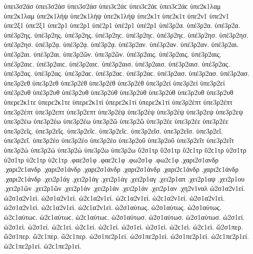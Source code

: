 {ὑπει3σ2άσ ὑπει3σ2άσ ὑπει3σ2άσ ὑπει3ϲ2άϲ ὑπει3ϲ2άϲ ὑπει3ϲ2άϲ 
ὑπε2κ1λαμ ὑπε2κ1λαμ   %
ὑπε2κ1λήψ ὑπε2κ1λήψ ὑπε2κ1λήψ   %
ὑπε2κ1τ ὑπε2κ1τ   %
ὑπε2ν1 ὑπε2ν1 
ὑπε2ξ1 ὑπε2ξ1 
ὑπε2ρ1 ὑπε2ρ1 
ὑπέ2ρ1 ὑπέ2ρ1 ὑπέ2ρ1 
ὑπέ3ρ2α. ὑπέ3ρ2α. ὑπέ3ρ2α.   %
ὑπέ3ρ2ης. ὑπέ3ρ2ης. ὑπέ3ρ2ης. ὑπέ3ρ2ηϲ. ὑπέ3ρ2ηϲ. ὑπέ3ρ2ηϲ. 
ὑπέ3ρ2ησ. ὑπέ3ρ2ησ. ὑπέ3ρ2ησ. 
ὑπέ3ρ2ᾳ. ὑπέ3ρ2ᾳ. ὑπέ3ρ2ᾳ. 
ὑπέ3ρ2αν. ὑπέ3ρ2αν. ὑπέ3ρ2αν. 
ὑπέ3ρ2αι. ὑπέ3ρ2αι. ὑπέ3ρ2αι. 
ὑπε3ρ2ῶν. ὑπε3ρ2ῶν. 
ὑπέ3ρ2αις. ὑπέ3ρ2αις. ὑπέ3ρ2αις. ὑπέ3ρ2αιϲ. ὑπέ3ρ2αιϲ. ὑπέ3ρ2αιϲ. 
ὑπέ3ρ2αισ. ὑπέ3ρ2αισ. ὑπέ3ρ2αισ. 
ὑπέ3ρ2ας. ὑπέ3ρ2ας. ὑπέ3ρ2ας. ὑπέ3ρ2αϲ. ὑπέ3ρ2αϲ. ὑπέ3ρ2αϲ. 
ὑπέ3ρ2ασ. ὑπέ3ρ2ασ. ὑπέ3ρ2ασ. 
ὑπε3ρ2εθ ὑπε3ρ2εθ   %
ὑπε3ρ2έθ ὑπε3ρ2έθ ὑπε3ρ2έθ 
ὑπε3ρ2εί ὑπε3ρ2εί ὑπε3ρ2εί   %
ὑπέ3ρ2υθ ὑπέ3ρ2υθ ὑπέ3ρ2υθ   %
ὑπε3ρ2ύθ ὑπε3ρ2ύθ ὑπε3ρ2ύθ 
ὑπε3ρ2υθ ὑπε3ρ2υθ   %
ὑπερε2κ1τε ὑπερε2κ1τε   %
ὑπερε2κ1τί ὑπερε2κ1τί ὑπερε2κ1τί   %
ὑπε3ρ2έπτ ὑπε3ρ2έπτ ὑπε3ρ2έπτ   %
ὑπε3ρ2επτ ὑπε3ρ2επτ 
ὑπε3ρ2έψ ὑπε3ρ2έψ ὑπε3ρ2έψ 
ὑπε3ρ2εψ ὑπε3ρ2εψ 
ὑπε3ρ2έω ὑπε3ρ2έω ὑπε3ρ2έω   %
ὑπε3ρ2ῶ ὑπε3ρ2ῶ 
ὑπε3ρ2έε ὑπε3ρ2έε ὑπε3ρ2έε 
ὑπε3ρ2εῖς. ὑπε3ρ2εῖς. ὑπε3ρ2εῖϲ. ὑπε3ρ2εῖϲ. 
ὑπε3ρ2εῖσ. ὑπε3ρ2εῖσ. 
ὑπε3ρ2εῖ. ὑπε3ρ2εῖ. 
ὑπε3ρ2έο ὑπε3ρ2έο ὑπε3ρ2έο 
ὑπε3ρ2οῦ ὑπε3ρ2οῦ 
ὑπε3ρ2εῖτ ὑπε3ρ2εῖτ 
ὑπε3ρ2ώ ὑπε3ρ2ώ ὑπε3ρ2ώ   %
ὑπε3ρ2ω ὑπε3ρ2ω   %
ὕ2σ1τρ ὕ2σ1τρ ὕ2ϲ1τρ ὕ2ϲ1τρ   %
ὑ2σ1τρ ὑ2σ1τρ ὑ2ϲ1τρ ὑ2ϲ1τρ   %
.φαε2σ1φ .φαε2ϲ1φ   %
.φω2σ1φ .φω2ϲ1φ   %
.χαρι2σ1ανδρ .χαρι2ϲ1ανδρ   %
.χαρι2σ1άνδρ .χαρι2σ1άνδρ .χαρι2σ1άνδρ .χαρι2ϲ1άνδρ .χαρι2ϲ1άνδρ .χαρι2ϲ1άνδρ 
.χει2ρ1άγ .χει2ρ1άγ .χει2ρ1άγ   %
.χει2ρ1αγ   %
.χει2ρ1απ   %
.χει2ρ1αψ   %
.χει2ρ1ου   %
.χει2ρ1ῶν .χει2ρ1ῶν   %
.χει2ρ1άν .χει2ρ1άν .χει2ρ1άν 
.χει2ρ1αν 
.χη2ν1ναλ   %
ὡ2σ1α2ν1εί. ὡ2σ1α2ν1εί. ὡ2σ1α2ν1εί. ὡ2ϲ1α2ν1εί. ὡ2ϲ1α2ν1εί. ὡ2ϲ1α2ν1εί.   %
ὡ2σ1α2ν1εὶ. ὡ2σ1α2ν1εὶ. ὡ2ϲ1α2ν1εὶ. ὡ2ϲ1α2ν1εὶ. 
ὡ2σ1αύτως. ὡ2σ1αύτως. ὡ2σ1αύτως. ὡ2ϲ1αύτωϲ. ὡ2ϲ1αύτωϲ. ὡ2ϲ1αύτωϲ.   %
ὡ2σ1αύτωσ. ὡ2σ1αύτωσ. ὡ2σ1αύτωσ. 
ὡ2σ1εί. ὡ2σ1εί. ὡ2σ1εί. ὡ2ϲ1εί. ὡ2ϲ1εί. ὡ2ϲ1εί.   %
ὡ2σ1εὶ. ὡ2σ1εὶ. ὡ2ϲ1εὶ. ὡ2ϲ1εὶ. 
ὥ2σ1περ. ὥ2σ1περ. ὥ2ϲ1περ. ὥ2ϲ1περ.   %
ὡ2σ1πε2ρ1εί. ὡ2σ1πε2ρ1εί. ὡ2σ1πε2ρ1εί. ὡ2ϲ1πε2ρ1εί. ὡ2ϲ1πε2ρ1εί. ὡ2ϲ1πε2ρ1εί.   %
}
